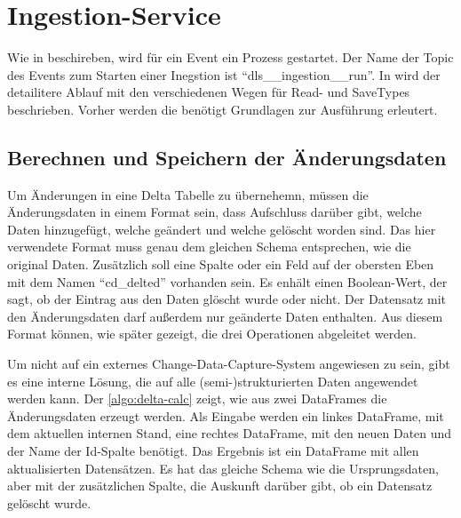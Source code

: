 \section{Ingestion-Service}

Wie in  beschireben, wird für ein Event ein Prozess gestartet.
Der Name der Topic des Events zum Starten einer Inegstion ist "`dls\_\_ingestion\_\_run"'.
In  wird der detailitere Ablauf mit den verschiedenen Wegen für Read- und SaveTypes beschrieben.
Vorher werden die benötigt Grundlagen zur Ausführung erleutert.

\subsection{Berechnen und Speichern der Änderungsdaten}
Um Änderungen in eine Delta Tabelle zu übernehemn, müssen die Änderungsdaten in einem Format sein, dass Aufschluss darüber gibt, welche Daten hinzugefügt, welche geändert und welche gelöscht worden sind.
Das hier verwendete Format muss genau dem gleichen Schema entsprechen, wie die original Daten.
Zusätzlich soll eine Spalte oder ein Feld auf der obersten Eben mit dem Namen "`cd\_delted"' vorhanden sein.
Es enhält einen Boolean-Wert, der sagt, ob der Eintrag aus den Daten glöscht wurde oder nicht.
Der Datensatz mit den Änderungsdaten darf außerdem nur geänderte Daten enthalten.
Aus diesem Format können, wie später gezeigt, die drei Operationen abgeleitet werden.

Um nicht auf ein externes Change-Data-Capture-System angewiesen zu sein, gibt es eine interne Lösung, die auf alle (semi-)strukturierten Daten angewendet werden kann.
Der \cref{algo:delta-calc} zeigt, wie aus zwei DataFrames die Änderungsdaten erzeugt werden.
Als Eingabe werden ein linkes DataFrame, mit dem aktuellen internen Stand, eine rechtes DataFrame, mit den neuen Daten und der Name der Id-Spalte benötigt.
Das Ergebnis ist ein DataFrame mit allen aktualisierten Datensätzen.
Es hat das gleiche Schema wie die Ursprungsdaten, aber mit der zusätzlichen Spalte, die Auskunft darüber gibt, ob ein Datensatz gelöscht wurde.

